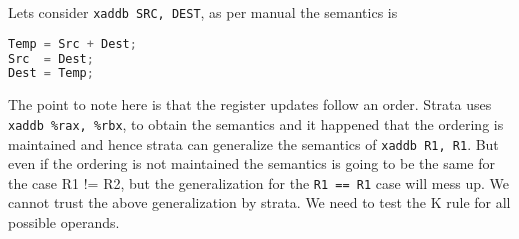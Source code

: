 Lets consider \texttt{xaddb\ SRC,\ DEST}, as per manual the semantics is
\begin{lstlisting}[language=C]
Temp = Src + Dest;
Src  = Dest;
Dest = Temp;
\end{lstlisting}

The point to note here is that the register updates follow an order.  Strata
uses \texttt{xaddb\ \%rax, \%rbx}, to obtain the semantics and it happened that
the ordering is maintained and hence strata can generalize the semantics of
\texttt{xaddb\ R1,\ R1}. But even if the ordering is not maintained the
semantics is going to be the same for the case R1 != R2, but the generalization
for the \texttt{R1\ ==\ R1} case will mess up.  We cannot trust the above
generalization by strata. We need to test the K rule for all possible operands.

